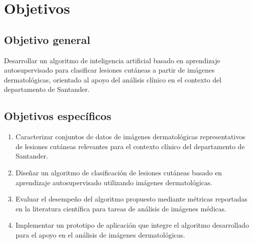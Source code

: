 \chapter{Objetivos}\label{chap:objetivos}

\section{Objetivo general}
Desarrollar un algoritmo de inteligencia artificial basado en aprendizaje autosupervisado para clasificar lesiones cutáneas a partir de imágenes dermatológicas, orientado al apoyo del análisis clínico en el contexto del departamento de Santander.

\section{Objetivos específicos}
\begin{enumerate}[label=\arabic*.,ref=\arabic*]
    \item Caracterizar conjuntos de datos de imágenes dermatológicas representativos de lesiones cutáneas relevantes para el contexto clínico del departamento de Santander.
    \item Diseñar un algoritmo de clasificación de lesiones cutáneas basado en aprendizaje autosupervisado utilizando imágenes dermatológicas.
    \item Evaluar el desempeño del algoritmo propuesto mediante métricas reportadas en la literatura científica para tareas de análisis de imágenes médicas.
    \item Implementar un prototipo de aplicación que integre el algoritmo desarrollado para el apoyo en el análisis de imágenes dermatológicas.
\end{enumerate}


